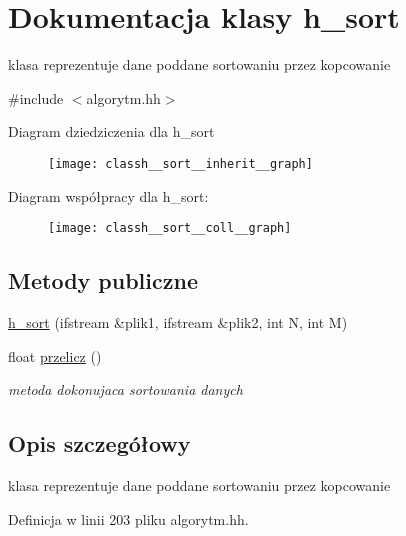 \hypertarget{classh__sort}{\section{\-Dokumentacja klasy h\-\_\-sort}
\label{classh__sort}
}


klasa reprezentuje dane poddane sortowaniu przez kopcowanie  




{\ttfamily \#include $<$algorytm.\-hh$>$}



\-Diagram dziedziczenia dla h\-\_\-sort
\nopagebreak
\begin{figure}[H]
\begin{center}
\leavevmode
\texttt{[image: classh\_\_sort\_\_inherit\_\_graph]}
\end{center}
\end{figure}


\-Diagram współpracy dla h\-\_\-sort\-:
\nopagebreak
\begin{figure}[H]
\begin{center}
\leavevmode
\texttt{[image: classh\_\_sort\_\_coll\_\_graph]}
\end{center}
\end{figure}
\subsection*{\-Metody publiczne}
\begin{DoxyCompactItemize}
\item 
\hyperlink{classh__sort_a27a9e6a24497264c3b9e0101f417e4ad}{h\-\_\-sort} (ifstream \&plik1, ifstream \&plik2, int \-N, int \-M)
\item 
float \hyperlink{classh__sort_a496c249e58b48ca10e06266d1f673bd7}{przelicz} ()
\begin{DoxyCompactList}\small\item\em metoda dokonujaca sortowania danych \end{DoxyCompactList}\end{DoxyCompactItemize}


\subsection{\-Opis szczegółowy}
klasa reprezentuje dane poddane sortowaniu przez kopcowanie 

\-Definicja w linii 203 pliku algorytm.\-hh.



